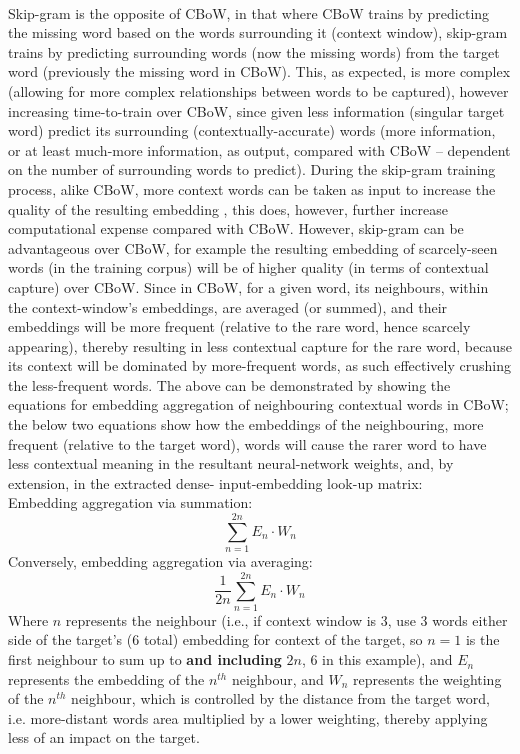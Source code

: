 \\Skip-gram is the opposite of CBoW, in that where CBoW trains by predicting the missing word based on the words surrounding it (context window), skip-gram trains by predicting surrounding words (now the missing words) from the target word (previously the missing word in CBoW). This, as expected, is more complex (allowing for more complex relationships between words to be captured), however increasing time-to-train over CBoW, since given less information (singular target word) predict its surrounding (contextually-accurate) words (more information, or at least much-more information, as output, compared with CBoW -- dependent on the number of surrounding words to predict). During the skip-gram training process, alike CBoW, more context words can be taken as input to increase the quality of the resulting embedding \citep{arxiv:cbow_sg}, this does, however, further increase computational expense compared with CBoW. However, skip-gram can be advantageous over CBoW, for example the resulting embedding of scarcely-seen words (in the training corpus) will be of higher quality (in terms of contextual capture) over CBoW. Since in CBoW, for a given word, its neighbours, within the context-window's embeddings, are averaged (or summed), and their embeddings will be more frequent (relative to the rare word, hence scarcely appearing), thereby resulting in less contextual capture for the rare word, because its context will be dominated by more-frequent words, as such effectively crushing the less-frequent words.
The above can be demonstrated by showing the equations for embedding aggregation of neighbouring contextual words in CBoW; the below two equations show how the embeddings of the neighbouring, more frequent (relative to the target word), words will cause the rarer word to have less contextual meaning in the resultant neural-network weights, and, by extension, in the extracted dense- input-embedding look-up matrix:\\
Embedding aggregation via summation:
$$\sum_{n=1}^{2n}E_{n}\cdot W_{n}$$
Conversely, embedding aggregation via averaging:
$$\frac{1}{2n}\sum_{n=1}^{2n}E_{n}\cdot W_{n}$$
Where $n$ represents the neighbour (i.e., if context window is 3, use 3 words either side of the target's (6 total) embedding for context of the target, so $n=1$ is the first neighbour to sum up to \textbf{and including} $2n$, 6 in this example), and $E_n$ represents the embedding of the $n^{th}$ neighbour, and $W_n$ represents the weighting of the $n^{th}$ neighbour, which is controlled by the distance from the target word, i.e. more-distant words area multiplied by a lower weighting, thereby applying less of an impact on the target.\\
